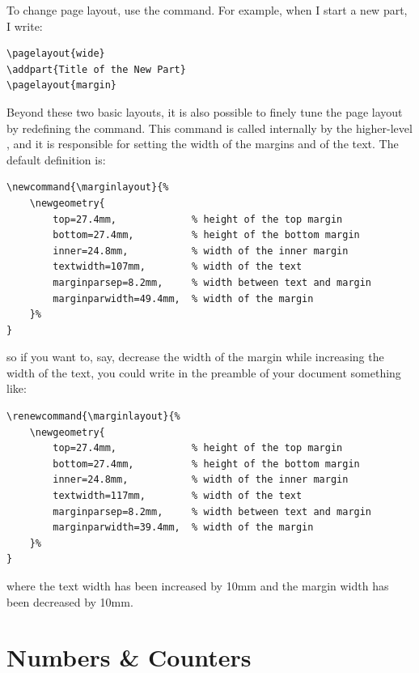 
To change page layout, use the  command. For 
example, when I start a new part, I write:

\begin{lstlisting}
\pagelayout{wide}
\addpart{Title of the New Part}
\pagelayout{margin}
\end{lstlisting}

Beyond these two basic layouts, it is also possible to finely tune the 
page layout by redefining the  command. This 
command is called internally by the higher-level , 
and it is responsible for setting the width of the margins and of the 
text. The default definition is:

\begin{lstlisting}
\newcommand{\marginlayout}{%
	\newgeometry{
		top=27.4mm,				% height of the top margin
		bottom=27.4mm,			% height of the bottom margin
		inner=24.8mm,			% width of the inner margin
		textwidth=107mm,		% width of the text
		marginparsep=8.2mm,		% width between text and margin
		marginparwidth=49.4mm,	% width of the margin
	}%
}
\end{lstlisting}

so if you want to, say, decrease the width of the margin while 
increasing the width of the text, you could write in the preamble of 
your document something like:

\begin{lstlisting}
\renewcommand{\marginlayout}{%
	\newgeometry{
		top=27.4mm,				% height of the top margin
		bottom=27.4mm,			% height of the bottom margin
		inner=24.8mm,			% width of the inner margin
		textwidth=117mm,		% width of the text
		marginparsep=8.2mm,		% width between text and margin
		marginparwidth=39.4mm,	% width of the margin
	}%
}
\end{lstlisting}

where the text width has been increased by 10mm and the margin width has 
been decreased by 10mm.

\section{Numbers \& Counters}

